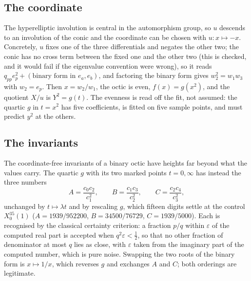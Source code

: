 \documentclass[11pt,reqno]{amsart}
\theoremstyle{plain}
\theoremstyle{definition}
\begin{document}
\subsection*{The coordinate}
The hyperelliptic involution is central in the automorphism group, so $u$ descends to an
involution of the conic and the coordinate can be chosen with $u\colon x\mapsto -x$. Concretely,
$u$ fixes one of the three differentials and negates the other two; the conic has no cross term
between the fixed one and the other two (this is checked, and it would fail if the eigenvalue
convention were wrong), so it reads $q_{pp}e_p^2+(\text{binary form in }e_a,e_b)$, and factoring
the binary form gives $w_2^2=w_1w_3$ with $w_2=e_p$. Then $x=w_2/w_1$, the octic is even,
$f(x)=g(x^2)$, and the quotient $X/u$ is $Y^2=g(t)$. The evenness is read off the fit, not
assumed: the quartic $g$ in $t=x^2$ has five coefficients, is fitted on five sample points, and
must predict $y^2$ at the others.

\subsection*{The invariants}
The coordinate-free invariants of a binary octic have heights far beyond what the values carry.
The quartic $g$ with its two marked points $t=0,\infty$ has instead the three numbers
\[
A=\frac{c_0c_2}{c_1^2},\qquad B=\frac{c_1c_3}{c_2^2},\qquad C=\frac{c_2c_4}{c_3^2},
\]
unchanged by $t\mapsto\lambda t$ and by rescaling $g$, which fifteen digits settle at the
control $X_0^{35}(1)$ ($A=1939/952200$, $B=34500/76729$, $C=1939/5000$). Each is recognised by
the classical certainty criterion: a fraction $p/q$ within $\varepsilon$ of the computed real part
is accepted when $q^2\varepsilon<\tfrac12$, so that no other fraction of denominator at most $q$
lies as close, with $\varepsilon$ taken from the imaginary part of the computed number, which is
pure noise. Swapping the two roots of the binary form is $x\mapsto 1/x$, which reverses $g$ and
exchanges $A$ and $C$; both orderings are legitimate.
\end{document}
